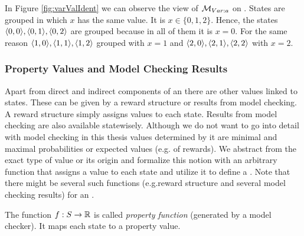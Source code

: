 \documentclass[preview]{standalone}
\begin{document}
In Figure \ref{fig:varValIdent} we can observe the view of ${{{{{\mathcal{M}}}}_{{Var:{a}}}}}$ on \chgph. States are grouped in which $x$ has the same value. It is $x \in \{0, 1, 2\}$. Hence, the states ${\langle0,0\rangle}, {\langle0,1\rangle},{\langle0,2\rangle}$ are grouped because in all of them it is $x=0$. For the same reason ${\langle1,0\rangle}, {\langle1,1\rangle},{\langle1,2\rangle}$ grouped with $x=1$ and ${\langle2,0\rangle}, {\langle2,1\rangle},{\langle2,2\rangle}$ with $x=2$.
\subsubsection{Property Values and Model Checking Results}
Apart from direct and indirect components of an \mdpN there are other values linked to states. These can be given by a reward structure or results from model checking. A reward structure simply assigns values to each state. Results from model checking are also available statewisely. Although we do not want to go into detail with model checking in this thesis values determined by it are minimal and maximal probabilities or expected values (e.g. of rewards). We abstract from the exact type of value or its origin and formalize this notion with an arbitrary function that assigns a value to each state and utilize it to define a \viewN. Note that there might be several such functions (e.g.reward structure and several model checking results) for an \chgphN.

\begin{definition}
	The function ${f} : {S} \to {\mathbb{R}}$ is called \emph{property function} (generated by a model checker). It maps each state to a property value.
\end{definition}
\end{document}
